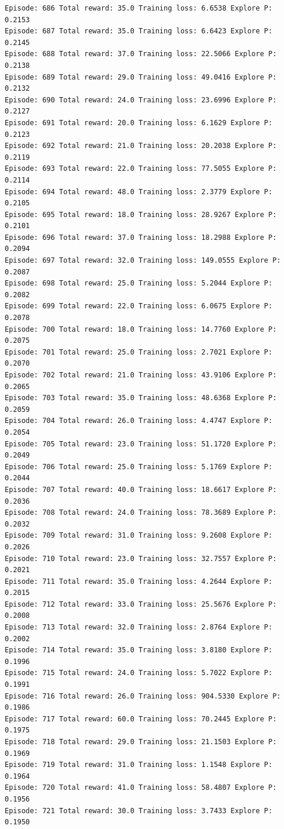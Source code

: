 \documentclass[11pt]{article}
\begin{document}
\begin{Verbatim}[commandchars=\\\{\}]
Episode: 686 Total reward: 35.0 Training loss: 6.6538 Explore P: 0.2153
Episode: 687 Total reward: 35.0 Training loss: 6.6423 Explore P: 0.2145
Episode: 688 Total reward: 37.0 Training loss: 22.5066 Explore P: 0.2138
Episode: 689 Total reward: 29.0 Training loss: 49.0416 Explore P: 0.2132
Episode: 690 Total reward: 24.0 Training loss: 23.6996 Explore P: 0.2127
Episode: 691 Total reward: 20.0 Training loss: 6.1629 Explore P: 0.2123
Episode: 692 Total reward: 21.0 Training loss: 20.2038 Explore P: 0.2119
Episode: 693 Total reward: 22.0 Training loss: 77.5055 Explore P: 0.2114
Episode: 694 Total reward: 48.0 Training loss: 2.3779 Explore P: 0.2105
Episode: 695 Total reward: 18.0 Training loss: 28.9267 Explore P: 0.2101
Episode: 696 Total reward: 37.0 Training loss: 18.2988 Explore P: 0.2094
Episode: 697 Total reward: 32.0 Training loss: 149.0555 Explore P: 0.2087
Episode: 698 Total reward: 25.0 Training loss: 5.2044 Explore P: 0.2082
Episode: 699 Total reward: 22.0 Training loss: 6.0675 Explore P: 0.2078
Episode: 700 Total reward: 18.0 Training loss: 14.7760 Explore P: 0.2075
Episode: 701 Total reward: 25.0 Training loss: 2.7021 Explore P: 0.2070
Episode: 702 Total reward: 21.0 Training loss: 43.9106 Explore P: 0.2065
Episode: 703 Total reward: 35.0 Training loss: 48.6368 Explore P: 0.2059
Episode: 704 Total reward: 26.0 Training loss: 4.4747 Explore P: 0.2054
Episode: 705 Total reward: 23.0 Training loss: 51.1720 Explore P: 0.2049
Episode: 706 Total reward: 25.0 Training loss: 5.1769 Explore P: 0.2044
Episode: 707 Total reward: 40.0 Training loss: 18.6617 Explore P: 0.2036
Episode: 708 Total reward: 24.0 Training loss: 78.3689 Explore P: 0.2032
Episode: 709 Total reward: 31.0 Training loss: 9.2608 Explore P: 0.2026
Episode: 710 Total reward: 23.0 Training loss: 32.7557 Explore P: 0.2021
Episode: 711 Total reward: 35.0 Training loss: 4.2644 Explore P: 0.2015
Episode: 712 Total reward: 33.0 Training loss: 25.5676 Explore P: 0.2008
Episode: 713 Total reward: 32.0 Training loss: 2.8764 Explore P: 0.2002
Episode: 714 Total reward: 35.0 Training loss: 3.8180 Explore P: 0.1996
Episode: 715 Total reward: 24.0 Training loss: 5.7022 Explore P: 0.1991
Episode: 716 Total reward: 26.0 Training loss: 904.5330 Explore P: 0.1986
Episode: 717 Total reward: 60.0 Training loss: 70.2445 Explore P: 0.1975
Episode: 718 Total reward: 29.0 Training loss: 21.1503 Explore P: 0.1969
Episode: 719 Total reward: 31.0 Training loss: 1.1548 Explore P: 0.1964
Episode: 720 Total reward: 41.0 Training loss: 58.4807 Explore P: 0.1956
Episode: 721 Total reward: 30.0 Training loss: 3.7433 Explore P: 0.1950

\end{Verbatim}
\end{document}
